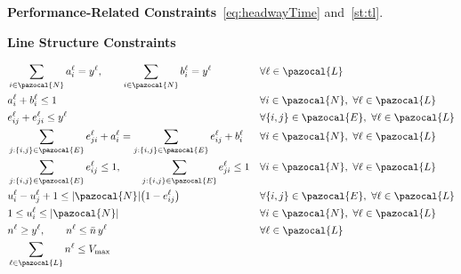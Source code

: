 \documentclass[a4paper,fleqn]{cas-sc}
\begin{document}
\textbf{Performance-Related Constraints}~\eqref{eq:headwayTime} and~\eqref{st:tl}.

\textbf{Line Structure Constraints}

\begin{align}
& \sum_{i \in \pazocal{N}} a_i^\ell = y^\ell, \qquad
  \sum_{i \in \pazocal{N}} b_i^\ell = y^\ell
&& \forall \ell \in \pazocal{L} \label{st:term_existence}\\
& a_i^\ell + b_i^\ell \le 1
&& \forall i \in \pazocal{N},\ \forall \ell \in \pazocal{L} \label{st:term_distinct}\\
& e_{ij}^\ell + e_{ji}^\ell \le y^\ell
&& \forall \{i,j\} \in \pazocal{E},\ \forall \ell \in \pazocal{L} \label{st:edge_activation}\\
& \sum_{j:\{i,j\} \in \pazocal{E}} e_{ji}^\ell + a_i^\ell
=
\sum_{j:\{i,j\} \in \pazocal{E}} e_{ij}^\ell + b_i^\ell
&& \forall i \in \pazocal{N},\ \forall \ell \in \pazocal{L} \label{st:flow_balance}\\
& \sum_{j:\{i,j\} \in \pazocal{E}} e_{ij}^\ell \le 1, \qquad
  \sum_{j:\{i,j\} \in \pazocal{E}} e_{ji}^\ell \le 1
&& \forall i \in \pazocal{N},\ \forall \ell \in \pazocal{L} \label{st:simple_path}\\
& u_i^\ell - u_j^\ell + 1
\le |\pazocal{N}| \big(1-e_{ij}^\ell\big)
&& \forall \{i,j\} \in \pazocal{E},\ \forall \ell \in \pazocal{L} \label{st:mtz_fwd}
\\
& 1 \le u_i^\ell \le |\pazocal{N}|
&& \forall i \in \pazocal{N},\ \forall \ell \in \pazocal{L} \label{st:mtz_bound}\\
& n^\ell \ge y^\ell, \qquad
  n^\ell \le \bar n \, y^\ell
&& \forall \ell \in \pazocal{L} \label{st:veh_bounds}\\
& \sum_{\ell \in \pazocal{L}} n^\ell \le V_{\max}
&& \label{st:veh_budget}
\end{align}
\end{document}
